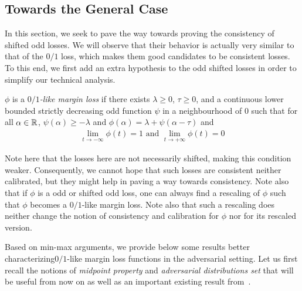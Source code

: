 \subsection{Towards the General Case}
\label{sec:consis-gen}
In this section, we seek to pave the way towards proving the consistency of shifted odd losses. We will observe that their behavior is actually very similar to that of the $0/1$ loss, which makes them good candidates to be consistent losses. To this end, we first add an extra hypothesis to the odd shifted losses in order to simplify our technical analysis.


\begin{definition}
\label{def:limits}
$\phi$ is a \emph{$0/1$-like margin loss} if there exists $\lambda\geq0$, $\tau\geq0$, and a continuous lower bounded strictly decreasing odd function \textcolor{black}{$\psi$} in a neighbourhood of $0$ such that for all $\alpha\in\mathbb{R}$, $\psi(\alpha)\geq -\lambda$ and $\phi(\alpha) = \lambda+\psi(\alpha-\tau)$ and
\begin{align*}
\lim_{t\to-\infty}\phi(t)=1\text{ and }\lim_{t\to+\infty}\phi(t)=0
\end{align*}
\end{definition}

Note here that the losses here are not necessarily shifted, making this condition weaker. Consequently, we cannot hope that such losses are consistent neither calibrated, but they might help in paving a way towards consistency.  Note also that if $\phi$ is a odd or shifted odd loss, one can always find a rescaling of $\phi$ such that $\phi$ becomes a $0/1$-like margin loss. Note also that such a rescaling does neither change the notion of consistency and calibration for $\phi$ nor for its rescaled version.






Based on min-max arguments, we provide below some results better characterizing$0/1$-like margin loss functions in the adversarial setting. Let us first recall the notions of \emph{midpoint property} and \emph{adversarial distributions set} that will be useful from now on as well as an important existing result from~\citet{pydi2021many}. 

